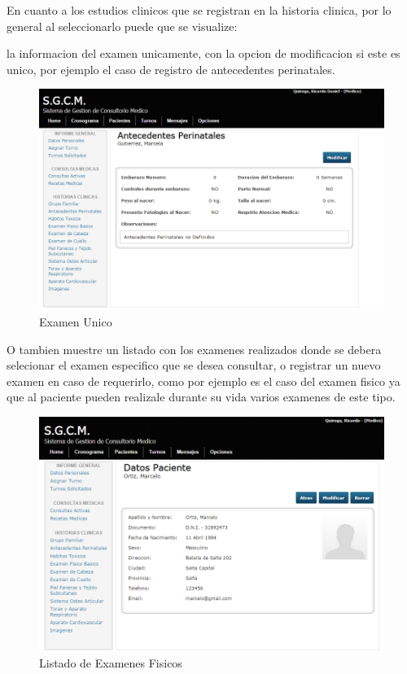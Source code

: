 En cuanto a los estudios clinicos que se registran en la historia clinica, por 
lo general al seleccionarlo puede que se visualize: 


la informacion del examen unicamente, con la opcion de modificacion si este es 
unico, por ejemplo el caso de registro de antecedentes perinatales.

\begin{figure}[H]
    \centering
    \includegraphics[scale=0.5]{resourse/modificar-perinatales.png}
    \caption{Examen Unico}
    \label{fig:618}
\end{figure}

O tambien muestre un listado con los examenes realizados donde se debera selecionar el 
examen especifico que se desea consultar, o registrar un nuevo examen en caso 
de requerirlo, como por ejemplo es el caso del examen fisico ya que al paciente 
pueden realizale durante su vida varios examenes de este tipo.

\begin{figure}[H]
    \centering
    \includegraphics[scale=0.5]{resourse/datos-paciente-m.png}
    \caption{Listado de Examenes Fisicos}
    \label{fig:619}
\end{figure}

